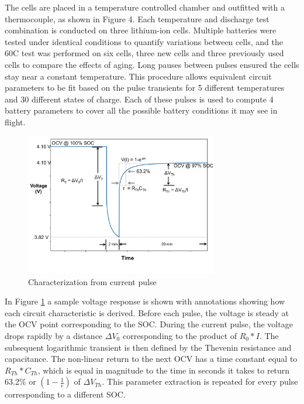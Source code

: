 \documentclass[]{aiaa-tc}%
\begin{document}
The cells are placed in a temperature controlled chamber and outfitted with a thermocouple, as shown in Figure 4. Each temperature and discharge test combination is conducted on three lithium-ion cells. Multiple batteries were tested under identical conditions to quantify variations between cells, and the 60C test was performed on six cells, three new cells and three previously used cells to compare the effects of aging. Long pauses between pulses ensured the cells stay near a constant temperature. This procedure allows equivalent circuit parameters to be fit based on the pulse transients for 5 different temperatures and 30 different states of charge. Each of these pulses is used to compute 4 battery parameters to cover all the possible battery conditions it may see in flight. 

\begin{figure}[!htb]
	\centering
	\includegraphics[width=0.75\textwidth]{figures/Batt_Char.png}
	\caption{Characterization from current pulse}
	\label{fig:BattChar}
\end{figure}

In Figure \ref{fig:BattChar} a sample voltage response is shown with annotations showing how each circuit characteristic is derived. Before each pulse, the voltage is steady at the OCV point corresponding to the SOC. During the current pulse, the voltage drops rapidly by a distance $\Delta V_{0}$ corresponding to the product of $R_{0}*I$. The subsequent logarithmic transient is then defined by the Thevenin resistance and capacitance. The non-linear return to the next OCV has a time constant equal to $R_{Th}*C_{Th}$, which is equal in magnitude to the time in seconds it takes to return 63.2\% or $(1-\frac{1}{e})$ of $\Delta V_{Th}$. This parameter extraction is repeated for every pulse corresponding to a different SOC.
\end{document}
